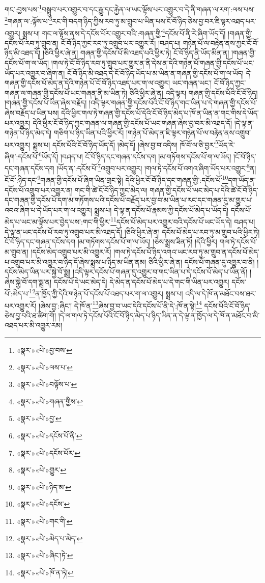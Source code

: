 གང་:བྱས་པས་\footnote{«སྣར་»«པེ་»བྱ་བས་}བསྒྲུབ་པར་འགྱུར་བ་དང་རྒྱུ་དང་རྐྱེན་ལ་ཡང་ལྟོས་པར་འགྱུར་བ་དེ་ནི་གཞན་ལ་རག་:ལས་པས་\footnote{«སྣར་»«པེ་»ལས་པ་}གཞན་ལ་:ལྟོས་པ་\footnote{«སྣར་»«པེ་»བལྟོས་པ་}རང་གི་བདག་ཉིད་ཀྱིས་རབ་ཏུ་མ་གྲུབ་པ་ཡིན་པས་ངོ་བོ་ཉིད་ཅེས་བྱ་བར་ཇི་ལྟར་འཐད་པར་འགྱུར། སྨྲས་པ། གང་ལ་ལྟོས་ནས་དེ་དངོས་པོར་འགྱུར་བའི་:གཞན་གྱི་\footnote{«སྣར་»«པེ་»གཞན་གྱིས་}དངོས་པོ་ནི་རེ་ཞིག་ཡོད་དོ། །གཞན་གྱི་དངོས་པོ་རབ་ཏུ་གྲུབ་ན། ངོ་བོ་ཉིད་ཀྱང་རབ་ཏུ་འགྲུབ་པར་འགྱུར་རོ། །བཤད་པ། གཉེན་པོ་ལ་བརྟེན་ནས་ཀྱང་ངོ་བོ་ཉིད་མི་འཐད་དོ། །ཅིའི་ཕྱིར་ཞེ་ན། གཞན་གྱི་དངོས་པོ་མི་འཐད་པའི་ཕྱིར་ཏེ། ངོ་བོ་ཉིད་ནི་ཡོད་མིན་ན། །གཞན་གྱི་དངོས་པོ་ག་ལ་ཡོད། །གལ་ཏེ་ངོ་བོ་ཉིད་རབ་ཏུ་གྲུབ་པར་གྱུར་ན་ནི་དེས་ན་དེའི་གཉེན་པོ་གཞན་གྱི་དངོས་པོ་ཡང་ཡོད་པར་འགྱུར་བ་ཞིག་ན། ངོ་བོ་ཉིད་མི་འཐད་དེ་ངོ་བོ་ཉིད་ཡོད་པ་མ་ཡིན་ན་གཞན་གྱི་དངོས་པོ་ག་ལ་ཡོད། དེ་གཞན་གྱི་དངོས་པོ་མེད་ན་དེའི་གཉེན་པོ་ངོ་བོ་ཉིད་འཐད་པར་ག་ལ་འགྱུར། ཡང་གཞན་ཡང་། ངོ་བོ་ཉིད་ཀྱང་གཞན་ལ་གཞན་གྱི་དངོས་པོ་ཡང་གཞན་ནི་མ་ཡིན་ཏེ། ཅིའི་ཕྱིར་ཞེ་ན། འདི་ལྟར། གཞན་གྱི་དངོས་པོའི་ངོ་བོ་ཉིད། །གཞན་གྱི་དངོས་པོ་ཡིན་ཞེས་བརྗོད། །འདི་ལྟར་གཞན་གྱི་དངོས་པོའི་ངོ་བོ་ཉིད་གང་ཡིན་པ་དེ་གཞན་གྱི་དངོས་པོ་ཞེས་བརྗོད་པ་ཡིན་པས། དེའི་ཕྱིར་གལ་ཏེ་གཞན་གྱི་དངོས་པོ་དེའི་ངོ་བོ་ཉིད་མེད་པ་ཁོ་ན་ཡིན་ན་གང་གིས་དེ་ཡོད་པར་འགྱུར། དེའི་ཕྱིར་ངོ་བོ་ཉིད་ཀྱང་གཞན་ལ་གཞན་གྱི་དངོས་པོ་ཡང་གཞན་ཞེས་བྱ་བར་མི་འཐད་དོ། །དེ་ལྟ་ན་གཉེན་པོ་ཉིད་མེད་དེ། གཅིག་པ་ཉིད་ཡིན་པའི་ཕྱིར་རོ། །གཉེན་པོ་མེད་ན་ཇི་ལྟར་གཉེན་པོ་ལ་བརྟེན་ནས་འགྲུབ་པར་འགྱུར། སྨྲས་པ། དངོས་པོའི་ངོ་བོ་ཉིད་ཡོད་དོ། །མེད་དོ། །ཞེས་བྱ་བ་འདིས། ཁོ་བོ་ལ་ཅི་བྱར་\footnote{«སྣར་»«པེ་»བྱ་}ཡོད་རེ་ཞིག་:དངོས་པོ་\footnote{«སྣར་»«པེ་»དངོས་པོ་ནི་}ཡོད་དོ། །བཤད་པ། ངོ་བོ་ཉིད་དང་གཞན་དངོས་དག །མ་གཏོགས་དངོས་པོ་ག་ལ་ཡོད། །ངོ་བོ་ཉིད་དང་གཞན་དངོས་དག །ཡོད་ན་:དངོས་པོ་\footnote{«སྣར་»«པེ་»དངོས་པོར་}འགྲུབ་པར་འགྱུར། །གལ་ཏེ་དངོས་པོ་འགའ་ཞིག་ཡོད་པར་འགྱུར་\footnote{«སྣར་»«པེ་»གྱུར་}ན། ངོ་བོ་:ཉིད་དང་\footnote{«སྣར་»«པེ་»ཉིད་མ་}གཞན་གྱི་དངོས་པོ་ཞིག་ཡིན་གྲང་སྟེ། དེའི་ཕྱིར་ངོ་བོ་ཉིད་དང་གཞན་གྱི་:དངོས་པོ་\footnote{«སྣར་»«པེ་»དངོས་}དག་ཡོད་ན་དངོས་པོ་འགྲུབ་པར་འགྱུར་ན། གང་གི་ཚེ་ངོ་བོ་ཉིད་ཀྱང་མེད་ལ། གཞན་གྱི་དངོས་པོ་ཡང་མེད་པ་དེའི་ཚེ་ངོ་བོ་ཉིད་དང་གཞན་གྱི་དངོས་པོ་དག་མ་གཏོགས་པའི་དངོས་པོ་བརྗོད་པར་བྱ་བ་མ་ཡིན་པ་རང་དང་གཞན་དུ་མ་གྱུར་པ་འབའ་ཞིག་པ་དེ་ཡོད་པར་ག་ལ་འགྱུར། སྨྲས་པ། དེ་ལྟ་ན་དངོས་པོ་རྣམས་ཀྱི་དངོས་པོ་མེད་པ་ཡོད་དེ། དངོས་པོ་མེད་པ་ཡང་མ་ལྟོས་པར་བྱེད་པས་:གང་གི་ཕྱིར་\footnote{«སྣར་»«པེ་»གང་གི་}དངོས་པོ་མེད་པར་འགྱུར་བའི་དངོས་པོ་ཡང་ཡོད་དེ། བཤད་པ། དེ་ལྟ་ན་ཡང་དངོས་པོ་རབ་ཏུ་འགྲུབ་པར་མི་འཐད་དོ། །ཅིའི་ཕྱིར་ཞེ་ན། དངོས་པོ་མེད་པ་རབ་ཏུ་མ་གྲུབ་པའི་ཕྱིར་ཏེ། ངོ་བོ་ཉིད་དང་གཞན་དངོས་དག །མ་གཏོགས་དངོས་པོ་ག་ལ་ཡོད། །ཅེས་སྨྲས་ཟིན་ཏོ། །དེའི་ཕྱིར། གལ་ཏེ་དངོས་པོ་མ་གྲུབ་ན། །དངོས་མེད་འགྲུབ་པར་མི་འགྱུར་རོ། །གལ་ཏེ་དངོས་པོ་ཉིད་འགའ་ཡང་རབ་ཏུ་མ་གྲུབ་ན་དངོས་པོ་མེད་པ་འགྲུབ་པར་མི་འགྱུར་བ་ཉིད་དོ་ཞེས་སྨྲས་པ་ཉིད་མ་ཡིན་ནམ། ཅིའི་ཕྱིར་ཞེ་ན། དངོས་པོ་གཞན་དུ་འགྱུར་བ་ནི། །དངོས་མེད་ཡིན་པར་སྐྱེ་བོ་སྨྲ། །འདི་ལྟར་དངོས་པོ་གཞན་དུ་འགྱུར་བ་གང་ཡིན་པ་དེ་དངོས་པོ་མེད་པ་ཡིན་ནོ། །ཞེས་སྐྱེ་བོ་དག་སྨྲ་ན། དངོས་པོ་དེ་ཡང་མེད་དེ། དེ་མེད་ན་དངོས་པོ་མེད་པ་དེ་གང་གི་ཡིན་པར་འགྱུར། དངོས་པོ་:མེད་པ་\footnote{«སྣར་»«པེ་»མེད་པ་མེད་}ན་ཁྱོད་ཀྱི་དེའི་གཉེན་པོ་དངོས་པོ་འཐད་པར་ག་ལ་འགྱུར། སྨྲས་པ། འདི་ལ་དེ་ཁོ་ན་མཐོང་བས་ཐར་པར་འགྱུར་རོ། །ཞེས་བྱ་:ཞིང་། དེ་ཁོ་ན་\footnote{«སྣར་»«པེ་»ཞིང་།ཏེ་}ཞེས་བྱ་བ་ཡང་དེའི་དངོས་པོ་ནི་དེ་:ཁོ་ན་སྟེ།\footnote{«སྣར་»«པེ་»ཁོ་ན་ཏེ།} དངོས་པོའི་ངོ་བོ་ཉིད་ཅེས་བྱ་བའི་ཐ་ཚིག་གོ། །དེ་ལ་གལ་ཏེ་དངོས་པོའི་ངོ་བོ་ཉིད་མེད་པ་ཉིད་ཡིན་ན་དེ་ལྟ་ན་ཁྱོད་ལ་དེ་ཁོ་ན་མཐོང་བ་མི་འཐད་པར་མི་འགྱུར་རམ། 